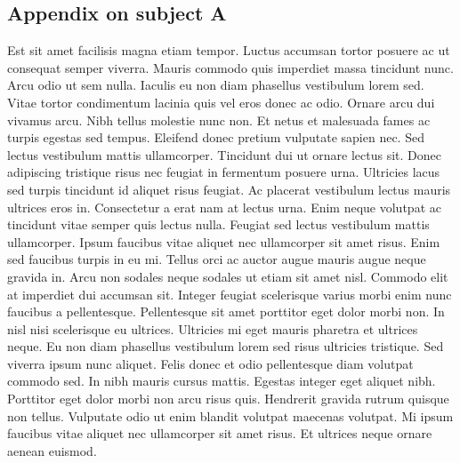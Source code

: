 \documentclass[11pt]{article}
\begin{document}
\clearpage
\begin{appendices}
	
\section{Appendix on subject A} \label{ap:plans}

\par Est sit amet facilisis magna etiam tempor. Luctus accumsan tortor posuere ac ut consequat semper viverra. Mauris commodo quis imperdiet massa tincidunt nunc. Arcu odio ut sem nulla. Iaculis eu non diam phasellus vestibulum lorem sed. Vitae tortor condimentum lacinia quis vel eros donec ac odio. Ornare arcu dui vivamus arcu. Nibh tellus molestie nunc non. Et netus et malesuada fames ac turpis egestas sed tempus. Eleifend donec pretium vulputate sapien nec. Sed lectus vestibulum mattis ullamcorper. Tincidunt dui ut ornare lectus sit. Donec adipiscing tristique risus nec feugiat in fermentum posuere urna. Ultricies lacus sed turpis tincidunt id aliquet risus feugiat. Ac placerat vestibulum lectus mauris ultrices eros in. Consectetur a erat nam at lectus urna. Enim neque volutpat ac tincidunt vitae semper quis lectus nulla. Feugiat sed lectus vestibulum mattis ullamcorper. Ipsum faucibus vitae aliquet nec ullamcorper sit amet risus. Enim sed faucibus turpis in eu mi. Tellus orci ac auctor augue mauris augue neque gravida in. Arcu non sodales neque sodales ut etiam sit amet nisl. Commodo elit at imperdiet dui accumsan sit. Integer feugiat scelerisque varius morbi enim nunc faucibus a pellentesque. Pellentesque sit amet porttitor eget dolor morbi non. In nisl nisi scelerisque eu ultrices. Ultricies mi eget mauris pharetra et ultrices neque. Eu non diam phasellus vestibulum lorem sed risus ultricies tristique. Sed viverra ipsum nunc aliquet. Felis donec et odio pellentesque diam volutpat commodo sed. In nibh mauris cursus mattis. Egestas integer eget aliquet nibh. Porttitor eget dolor morbi non arcu risus quis. Hendrerit gravida rutrum quisque non tellus. Vulputate odio ut enim blandit volutpat maecenas volutpat. Mi ipsum faucibus vitae aliquet nec ullamcorper sit amet risus. Et ultrices neque ornare aenean euismod.

\clearpage
\end{appendices}

\clearpage
\singlespacing
\printbibliography
\end{document}

